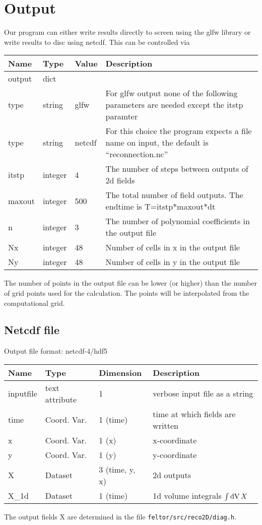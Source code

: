 \section{Output}
Our program can either write results directly to screen using the glfw library
or write results to disc using netcdf.
This can be controlled via
\begin{longtable}{lllp{9cm}}
\toprule
\rowcolor{gray!50}\textbf{Name} &  \textbf{Type} & \textbf{Value}  & \textbf{Description}  \\ \midrule
output & dict & & \\
\qquad type & string & glfw  &  For glfw output none of the following parameters are needed except the itstp paramter\\
\qquad type & string & netcdf  & For this choice the program expects a file name on input, the default is ``reconnection.nc'' \\
\qquad itstp  & integer& 4 & The number of steps between outputs of 2d fields \\
\qquad maxout  & integer& 500 & The total number of field outputs. The endtime is T=itstp*maxout*dt \\
\qquad n  & integer & 3  & The number of polynomial coefficients in the output file\\
\qquad Nx & integer & 48 & Number of cells in x in the output file \\
\qquad Ny & integer & 48 & Number of cells in y in the output file \\
\bottomrule
\end{longtable}
The number of points in the output file can be lower (or higher) than the number of
grid points used for the calculation. The points will be interpolated from the
computational grid.
\subsection{Netcdf file}
Output file format: netcdf-4/hdf5

\begin{longtable}{lll>{\RaggedRight}p{7cm}}
\toprule
\rowcolor{gray!50}\textbf{Name} &  \textbf{Type} & \textbf{Dimension} & \textbf{Description}  \\ \midrule
inputfile        & text attribute & 1 & verbose input file as a string \\
time             & Coord. Var. & 1 (time) & time at which fields are written \\
x                & Coord. Var. & 1 (x) & x-coordinate  \\
y                & Coord. Var. & 1 (y) & y-coordinate \\
X                & Dataset & 3 (time, y, x) & 2d outputs \\
X\_1d            & Dataset & 1 (time) & 1d volume integrals $\int \mathrm{dV}\, X$ \\
\bottomrule
\end{longtable}
The output fields X are determined in the file \texttt{feltor/src/reco2D/diag.h}.

